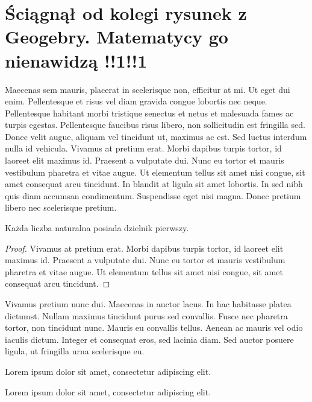 \section{Ściągnął od kolegi rysunek z Geogebry. Matematycy go nienawidzą !!1!!1}
Maecenas sem mauris, placerat in scelerisque non, efficitur at mi. Ut eget dui enim. Pellentesque et risus vel diam gravida congue lobortis nec neque. Pellentesque habitant morbi tristique senectus et netus et malesuada fames ac turpis egestas. Pellentesque faucibus risus libero, non sollicitudin est fringilla sed. Donec velit augue, aliquam vel tincidunt ut, maximus ac est. Sed luctus interdum nulla id vehicula. Vivamus at pretium erat. Morbi dapibus turpis tortor, id laoreet elit maximus id. Praesent a vulputate dui. Nunc eu tortor et mauris vestibulum pharetra et vitae augue. Ut elementum tellus sit amet nisi congue, sit amet consequat arcu tincidunt. In blandit at ligula sit amet lobortis. In sed nibh quis diam accumsan condimentum. Suspendisse eget nisi magna. Donec pretium libero nec scelerisque pretium.
\begin{theorem}
    Każda liczba naturalna posiada dzielnik pierwszy.
\end{theorem}
\begin{proof}
    Vivamus at pretium erat. Morbi dapibus turpis tortor, id laoreet elit maximus id. Praesent a vulputate dui. Nunc eu tortor et mauris vestibulum pharetra et vitae augue. Ut elementum tellus sit amet nisi congue, sit amet consequat arcu tincidunt.
\end{proof}
\newpage
Vivamus pretium nunc dui. Maecenas in auctor lacus. In hac habitasse platea dictumst. Nullam maximus tincidunt purus sed convallis. Fusce nec pharetra tortor, non tincidunt nunc. Mauris eu convallis tellus. Aenean ac mauris vel odio iaculis dictum. Integer et consequat eros, sed lacinia diam. Sed auctor posuere ligula, ut fringilla urna scelerisque eu.
\begin{definition}
    Lorem ipsum dolor sit amet, consectetur adipiscing elit.
\end{definition}
\begin{remark}
    Lorem ipsum dolor sit amet, consectetur adipiscing elit.
\end{remark}